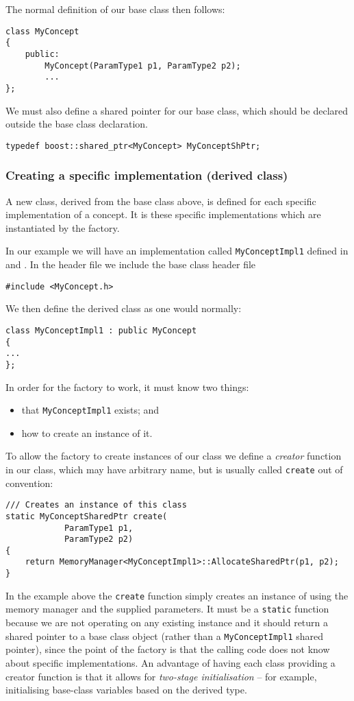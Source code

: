 The normal definition of our base class then follows:
\begin{lstlisting}
class MyConcept 
{
    public:
        MyConcept(ParamType1 p1, ParamType2 p2);
        ...
};
\end{lstlisting}

We must also define a shared pointer for our base class, which should be declared outside the base class declaration.
\begin{lstlisting}
typedef boost::shared_ptr<MyConcept> MyConceptShPtr;
\end{lstlisting}


\subsubsection{Creating a specific implementation (derived class)}
A new class, derived from the base class above, is defined for each specific implementation of a concept. It is these
specific implementations which are instantiated by the factory.

In our example we will have an implementation called \lstinline{MyConceptImpl1}
defined in  and . In the
header file we include the base class header file
\begin{lstlisting}
#include <MyConcept.h>
\end{lstlisting}

We then define the derived class as one would normally:
\begin{lstlisting}
class MyConceptImpl1 : public MyConcept
{
...
};
\end{lstlisting}

In order for the factory to work, it must know two things:
\begin{itemize}
\item that \lstinline{MyConceptImpl1} exists; and
\item how to create an instance of it.
\end{itemize}

To allow the factory to create instances of our class we define a \emph{creator} function in our class, which may have arbitrary name, but is usually called \lstinline{create} out of convention:
\begin{lstlisting}
/// Creates an instance of this class
static MyConceptSharedPtr create(
            ParamType1 p1,
            ParamType2 p2)
{
    return MemoryManager<MyConceptImpl1>::AllocateSharedPtr(p1, p2);
}
\end{lstlisting}
In the example above the \lstinline{create} function simply creates an instance of  using the {\nek} memory manager and the
supplied parameters. It must be a \lstinline{static} function because we are not operating on any existing instance and it should return a shared pointer to a base class object (rather than a \lstinline{MyConceptImpl1} shared pointer), since the point of the factory is that the calling code does not know about specific implementations. An advantage of having each class providing a creator function is that it allows for \emph{two-stage initialisation} -- for example, initialising base-class variables based on the derived type.


